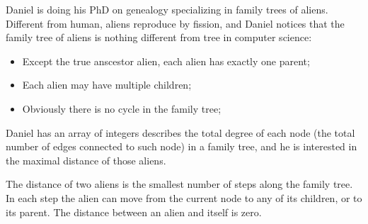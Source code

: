 Daniel is doing his PhD on genealogy specializing in family trees of aliens.
Different from human, aliens reproduce by fission, and Daniel notices that the family tree of aliens is
nothing different from tree in computer science: 

\begin{itemize}
  \item Except the true anscestor alien, each alien has exactly one parent;
  \item Each alien may have multiple children;
  \item Obviously there is no cycle in the family tree;
\end{itemize}

Daniel has an array of integers describes the total degree of each node
(the total number of edges connected to such node) in a family tree,
and he is interested in the maximal distance of those aliens.

The distance of two aliens is the smallest number of steps along the family tree.
In each step the alien can move from the current node to any of its children, or to its parent.
The distance between an alien and itself is zero.
